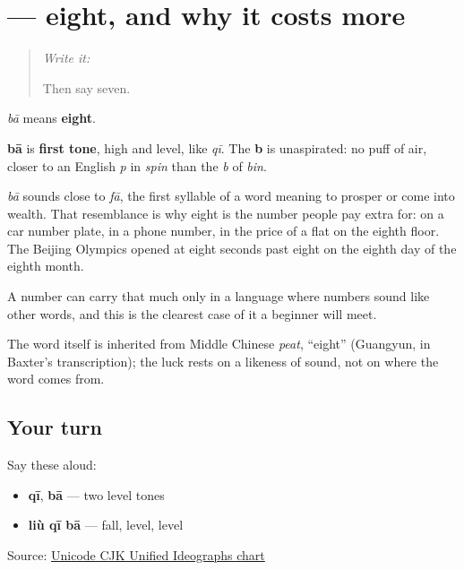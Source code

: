 \section[\texorpdfstring{\zh{八} (bā)}{八 (bā)}]{ — eight, and why it costs more}

\label{lesson:ZH-C20-ba}



\begin{quote}
\emph{Write it:} 

Then say seven.
\end{quote}

\begin{sounds}
\textbf{} \emph{bā} means \textbf{eight}.

\textbf{bā} is \textbf{first tone}, high and level, like \emph{qī}. The \textbf{b} is unaspirated: no puff of air, closer to an English \emph{p} in \emph{spin} than the \emph{b} of \emph{bin}.
\end{sounds}

\begin{cousinweb}
\emph{bā} sounds close to \emph{fā}, the first syllable of a word meaning to prosper or come into wealth. That resemblance is why eight is the number people pay extra for: on a car number plate, in a phone number, in the price of a flat on the eighth floor. The Beijing Olympics opened at eight seconds past eight on the eighth day of the eighth month.

A number can carry that much only in a language where numbers sound like other words, and this is the clearest case of it a beginner will meet.

The word itself is inherited from Middle Chinese \emph{peat}, \textquotedblleft{}eight\textquotedblright{} (Guangyun, in Baxter's transcription); the luck rests on a likeness of sound, not on where the word comes from.
\end{cousinweb}

\subsection*{Your turn}
Say these aloud:

\begin{itemize}
\raggedright
  \item \textbf{qī}, \textbf{bā} — two level tones
  \item \textbf{liù qī bā} — fall, level, level
\end{itemize}

\begin{tcolorbox}[breakable,colback=teal!4,colframe=teal!35!black,title={Before you move on}]
Source: \href{https://www.unicode.org/charts/PDF/U4E00.pdf}{Unicode CJK Unified Ideographs chart}
\end{tcolorbox}
